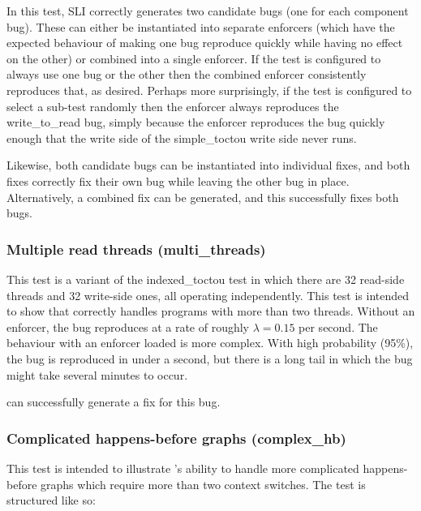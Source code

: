 In this test, SLI correctly generates two candidate bugs (one for each
component bug).  These can either be instantiated into separate
enforcers (which have the expected behaviour of making one bug
reproduce quickly while having no effect on the other) or combined
into a single enforcer.  If the test is configured to always use one
bug or the other then the combined enforcer consistently reproduces
that, as desired.  Perhaps more surprisingly, if the test is
configured to select a sub-test randomly then the enforcer always
reproduces the write\_to\_read bug, simply because the enforcer
reproduces the bug quickly enough that the write side of the
simple\_toctou write side never runs.

Likewise, both candidate bugs can be instantiated into individual
fixes, and both fixes correctly fix their own bug while leaving the
other bug in place.  Alternatively, a combined fix can be generated,
and this successfully fixes both bugs.

\subsubsection{Multiple read threads (multi\_threads)}

This test is a variant of the indexed\_toctou test in which there are
32 read-side threads and 32 write-side ones, all operating
independently.  This test is intended to show that {\implementation}
correctly handles programs with more than two threads.  Without an
enforcer, the bug reproduces at a rate of roughly $\lambda = 0.15$ per
second.  The behaviour with an enforcer loaded is more complex.  With
high probability (95\%), the bug is reproduced in under a second, but
there is a long tail in which the bug might take several minutes to
occur.  

{\Technique} can successfully generate a fix for this bug.


\subsubsection{Complicated happens-before graphs (complex\_hb)}

This test is intended to illustrate {\technique}'s ability to handle
more complicated happens-before graphs which require more than two
context switches.  The test is structured like so:

